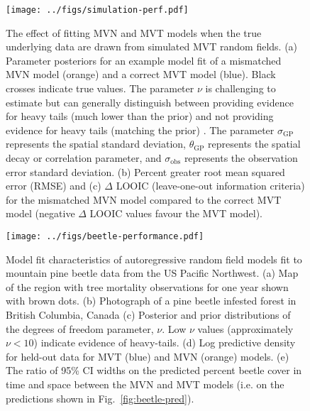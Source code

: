 \documentclass[12pt,english]{article}
\begin{document}
\begin{spacing}{1.8}
\begin{figure}[htb]
  \begin{center}
    \texttt{[image: ../figs/simulation-perf.pdf]}
    \caption{
      The effect of fitting MVN and MVT models
      when the true underlying data are drawn from simulated MVT random fields.
      (a) Parameter posteriors for an
      example model fit of a mismatched MVN model (orange)
      and a correct MVT model (blue). Black crosses indicate true values.
      The parameter $\nu$ is challenging to estimate but can generally
      distinguish between providing evidence for heavy tails
      (much lower than the prior) and not providing evidence for heavy tails
      (matching the prior) \citep{anderson2017}.
      The parameter
      $\sigma_{\mathrm{GP}}$ represents the spatial standard deviation,
      $\theta_{\mathrm{GP}}$ represents the spatial decay or correlation parameter,
      and $\sigma_\mathrm{obs}$ represents the observation error standard deviation.
      (b) Percent greater root mean squared error (RMSE)
      and (c) $\Delta$ LOOIC (leave-one-out information criteria)
      for the mismatched MVN model compared to the correct MVT model (negative
      $\Delta$ LOOIC values favour the MVT model).
    }
    \label{fig:sim-performance}
  \end{center}
\end{figure}

\begin{figure}[htb]
  \begin{center}
    \texttt{[image: ../figs/beetle-performance.pdf]}
    \caption{
      Model fit characteristics of autoregressive random field
      models fit to mountain pine beetle data from the US Pacific Northwest.
      (a) Map of the region with tree mortality observations for one year shown with
      brown dots.
      (b) Photograph of a pine beetle infested forest in British Columbia, Canada
      (c) Posterior and prior distributions of the degrees of freedom parameter, $\nu$.
      Low $\nu$ values (approximately $\nu < 10$) indicate evidence of heavy-tails.
      (d) Log predictive density for held-out data for MVT (blue) and MVN (orange) models.
      (e) The ratio of 95\% CI widths on the predicted percent beetle cover in
      time and space between the MVN and MVT models (i.e. on the predictions
      shown in Fig.~\ref{fig:beetle-pred}).
    }
    \label{fig:map-etc}
  \end{center}
\end{figure}


\end{spacing}
\end{document}
